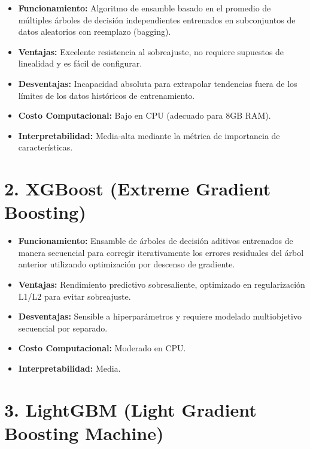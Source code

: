\documentclass[
  spanish,
  12pt,
]{report}
\providecommand{\tightlist}{%
  \setlength{\itemsep}{0pt}\setlength{\parskip}{0pt}}
\begin{document}
\begin{itemize}
\tightlist
\item
  \textbf{Funcionamiento:} Algoritmo de ensamble basado en el promedio
  de múltiples árboles de decisión independientes entrenados en
  subconjuntos de datos aleatorios con reemplazo (bagging).
\item
  \textbf{Ventajas:} Excelente resistencia al sobreajuste, no requiere
  supuestos de linealidad y es fácil de configurar.
\item
  \textbf{Desventajas:} Incapacidad absoluta para extrapolar tendencias
  fuera de los límites de los datos históricos de entrenamiento.
\item
  \textbf{Costo Computacional:} Bajo en CPU (adecuado para 8GB RAM).
\item
  \textbf{Interpretabilidad:} Media-alta mediante la métrica de
  importancia de características.
\end{itemize}

\section{2. XGBoost (Extreme Gradient
Boosting)}\label{xgboost-extreme-gradient-boosting}

\begin{itemize}
\tightlist
\item
  \textbf{Funcionamiento:} Ensamble de árboles de decisión aditivos
  entrenados de manera secuencial para corregir iterativamente los
  errores residuales del árbol anterior utilizando optimización por
  descenso de gradiente.
\item
  \textbf{Ventajas:} Rendimiento predictivo sobresaliente, optimizado en
  regularización L1/L2 para evitar sobreajuste.
\item
  \textbf{Desventajas:} Sensible a hiperparámetros y requiere modelado
  multiobjetivo secuencial por separado.
\item
  \textbf{Costo Computacional:} Moderado en CPU.
\item
  \textbf{Interpretabilidad:} Media.
\end{itemize}

\section{3. LightGBM (Light Gradient Boosting
Machine)}\label{lightgbm-light-gradient-boosting-machine}
\end{document}
